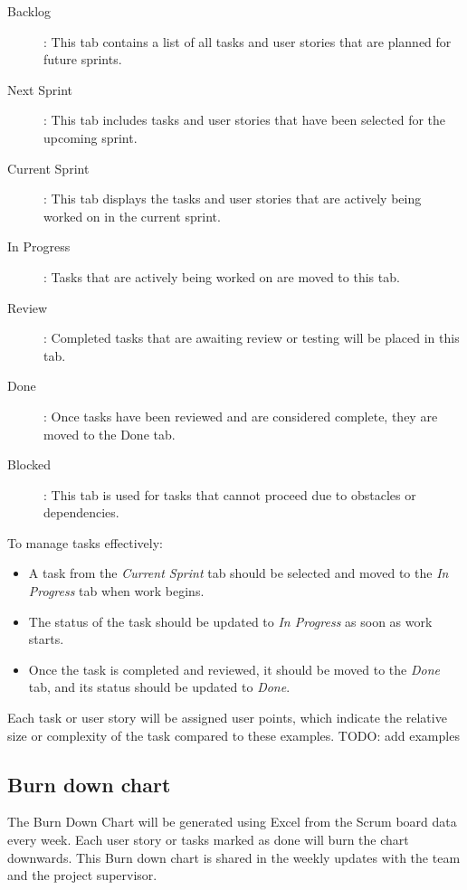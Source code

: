 \documentclass{projdoc}
\begin{document}
\begin{description}
	\item[Backlog]: This tab contains a list of all tasks and user stories that are planned for future sprints.
	\item[Next Sprint]: This tab includes tasks and user stories that have been selected for the upcoming sprint.
	\item[Current Sprint]: This tab displays the tasks and user stories that are actively being worked on in the current sprint.
	\item[In Progress]: Tasks that are actively being worked on are moved to this tab.
	\item[Review]: Completed tasks that are awaiting review or testing will be placed in this tab.
	\item[Done]: Once tasks have been reviewed and are considered complete, they are moved to the Done tab.
	\item [Blocked]: This tab is used for tasks that cannot proceed due to obstacles or dependencies.
\end{description}

\noindent
To manage tasks effectively:
\begin{itemize}
	\item A task from the \emph{Current Sprint} tab should be selected and moved to the \emph{In Progress} tab when work begins. 
	\item The status of the task should be updated to \emph{In Progress} as soon as work starts.
	\item Once the task is completed and reviewed, it should be moved to the \emph{Done} tab, and its status should be updated to \emph{Done}.
\end{itemize}

\noindent
Each task or user story will be assigned user points, which indicate the relative size or complexity of the task compared to these examples.
TODO: add examples

\subsection{Burn down chart}
The Burn Down Chart will be generated using Excel from the Scrum board data every week.
Each user story or tasks marked as done will burn the chart downwards.
This Burn down chart is shared in the weekly updates with the team and the project supervisor.
\newpage

\end{document}
